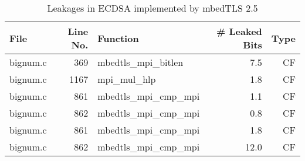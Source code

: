 \begin{table}[h!]
\centering\tiny\scriptsize
\caption{Leakages in ECDSA implemented by mbedTLS 2.5}\label{tab:t_ECDSALibgcrypt2.5-nonce}
\begin{tabular}{lrlrr}
\hline
\textbf{File} & \textbf{Line No.} & \textbf{Function} & \textbf{\# Leaked Bits} & \textbf{Type} \\\hline
bignum.c& 369&mbedtls\_mpi\_bitlen&7.5 &CF\\
bignum.c& 1167&mpi\_mul\_hlp&1.8 &CF\\
bignum.c& 861&mbedtls\_mpi\_cmp\_mpi&1.1 &CF\\
bignum.c& 862&mbedtls\_mpi\_cmp\_mpi&0.8 &CF\\
bignum.c& 861&mbedtls\_mpi\_cmp\_mpi&1.8 &CF\\
bignum.c& 862&mbedtls\_mpi\_cmp\_mpi&12.0 &CF\\
\hline
\end{tabular}
\renewcommand{\baselinestretch}{1.0}\selectfont
\end{table}
